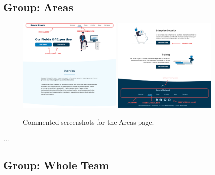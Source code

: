\documentclass[12pt]{report}
\begin{document}
\subsection{Group: Areas}

\begin{figure}[H]
	\centering
	\includegraphics[width=0.45\textwidth]{high_fid_wireframes/all_areas/1.png}
	\includegraphics[width=0.45\textwidth]{high_fid_wireframes/all_areas/2.png}
	\caption{Commented screenshots for the Areas page.}
\end{figure}
\color{white}...\color{black}

\subsection{Group: Whole Team}
\end{document}
